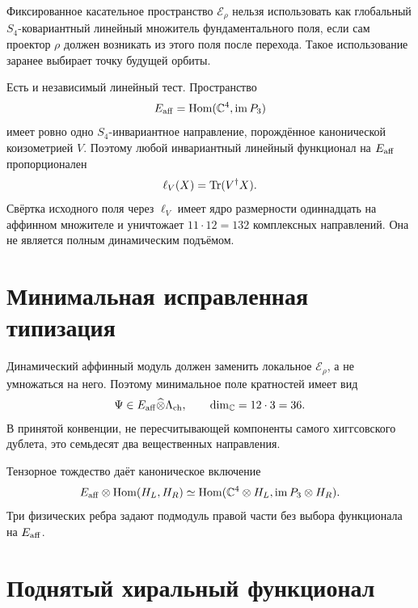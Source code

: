 \begin{theorem}
Фиксированное касательное пространство $\mathcal E_\rho$ нельзя использовать
как глобальный $S_4$-ковариантный линейный множитель фундаментального поля,
если сам проектор $\rho$ должен возникать из этого поля после перехода.
Такое использование заранее выбирает точку будущей орбиты.
\end{theorem}

Есть и независимый линейный тест. Пространство
\begin{equation}
 E_{\rm aff}=\operatorname{Hom}(\mathbb C^4,\operatorname{im}P_3)
\end{equation}
имеет ровно одно $S_4$-инвариантное направление, порождённое канонической
коизометрией $V$. Поэтому любой инвариантный линейный функционал на
$E_{\rm aff}$ пропорционален
\begin{equation}
 \ell_V(X)=\operatorname{Tr}(V^\dagger X).
 \label{eq:v7-affine-invariant-functional}
\end{equation}
Свёртка исходного поля через $\ell_V$ имеет ядро размерности одиннадцать на
аффинном множителе и уничтожает $11\cdot12=132$ комплексных направлений.
Она не является полным динамическим подъёмом.

\section{Минимальная исправленная типизация}

Динамический аффинный модуль должен заменить локальное
$\mathcal E_\rho$, а не умножаться на него. Поэтому минимальное поле
кратностей имеет вид
\begin{equation}
 \Psi\in E_{\rm aff}\widehat\otimes\Lambda_{\rm ch},
 \qquad
 \dim_{\mathbb C}=12\cdot3=36.
 \label{eq:v7-corrected-affine-edge-field}
\end{equation}
В принятой конвенции, не пересчитывающей компоненты самого хиггсовского
дублета, это семьдесят два вещественных направления.

Тензорное тождество даёт каноническое включение
\begin{equation}
 E_{\rm aff}\otimes\operatorname{Hom}(H_L,H_R)
 \simeq
 \operatorname{Hom}(\mathbb C^4\otimes H_L,
                     \operatorname{im}P_3\otimes H_R).
 \label{eq:v7-canonical-tensor-hom-lift}
\end{equation}
Три физических ребра задают подмодуль правой части без выбора функционала
на $E_{\rm aff}$.

\section{Поднятый хиральный функционал}

